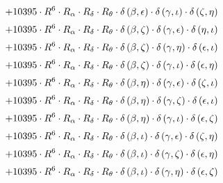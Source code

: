 \begin{subequations}
\begin{gather}
 \\[0.2em] \notag 		 + 10395 \cdot R^{6} \cdot R_{\alpha{}} \cdot R_{\delta{}} \cdot R_{\theta{}} \cdot \delta{}\left(\beta{}, \epsilon{}\right) \cdot \delta{}\left(\gamma{}, \iota{}\right) \cdot \delta{}\left(\zeta{}, \eta{}\right) 
 \\[0.2em] \notag 		 + 10395 \cdot R^{6} \cdot R_{\alpha{}} \cdot R_{\delta{}} \cdot R_{\theta{}} \cdot \delta{}\left(\beta{}, \zeta{}\right) \cdot \delta{}\left(\gamma{}, \epsilon{}\right) \cdot \delta{}\left(\eta{}, \iota{}\right) 
 \\[0.2em] \notag 		 + 10395 \cdot R^{6} \cdot R_{\alpha{}} \cdot R_{\delta{}} \cdot R_{\theta{}} \cdot \delta{}\left(\beta{}, \zeta{}\right) \cdot \delta{}\left(\gamma{}, \eta{}\right) \cdot \delta{}\left(\epsilon{}, \iota{}\right) 
 \\[0.2em] \notag 		 + 10395 \cdot R^{6} \cdot R_{\alpha{}} \cdot R_{\delta{}} \cdot R_{\theta{}} \cdot \delta{}\left(\beta{}, \zeta{}\right) \cdot \delta{}\left(\gamma{}, \iota{}\right) \cdot \delta{}\left(\epsilon{}, \eta{}\right) 
 \\[0.2em] \notag 		 + 10395 \cdot R^{6} \cdot R_{\alpha{}} \cdot R_{\delta{}} \cdot R_{\theta{}} \cdot \delta{}\left(\beta{}, \eta{}\right) \cdot \delta{}\left(\gamma{}, \epsilon{}\right) \cdot \delta{}\left(\zeta{}, \iota{}\right) 
 \\[0.2em] \notag 		 + 10395 \cdot R^{6} \cdot R_{\alpha{}} \cdot R_{\delta{}} \cdot R_{\theta{}} \cdot \delta{}\left(\beta{}, \eta{}\right) \cdot \delta{}\left(\gamma{}, \zeta{}\right) \cdot \delta{}\left(\epsilon{}, \iota{}\right) 
 \\[0.2em] \notag 		 + 10395 \cdot R^{6} \cdot R_{\alpha{}} \cdot R_{\delta{}} \cdot R_{\theta{}} \cdot \delta{}\left(\beta{}, \eta{}\right) \cdot \delta{}\left(\gamma{}, \iota{}\right) \cdot \delta{}\left(\epsilon{}, \zeta{}\right) 
 \\[0.2em] \notag 		 + 10395 \cdot R^{6} \cdot R_{\alpha{}} \cdot R_{\delta{}} \cdot R_{\theta{}} \cdot \delta{}\left(\beta{}, \iota{}\right) \cdot \delta{}\left(\gamma{}, \epsilon{}\right) \cdot \delta{}\left(\zeta{}, \eta{}\right) 
 \\[0.2em] \notag 		 + 10395 \cdot R^{6} \cdot R_{\alpha{}} \cdot R_{\delta{}} \cdot R_{\theta{}} \cdot \delta{}\left(\beta{}, \iota{}\right) \cdot \delta{}\left(\gamma{}, \zeta{}\right) \cdot \delta{}\left(\epsilon{}, \eta{}\right) 
 \\[0.2em] \notag 		 + 10395 \cdot R^{6} \cdot R_{\alpha{}} \cdot R_{\delta{}} \cdot R_{\theta{}} \cdot \delta{}\left(\beta{}, \iota{}\right) \cdot \delta{}\left(\gamma{}, \eta{}\right) \cdot \delta{}\left(\epsilon{}, \zeta{}\right) 

\end{gather}
\end{subequations}
